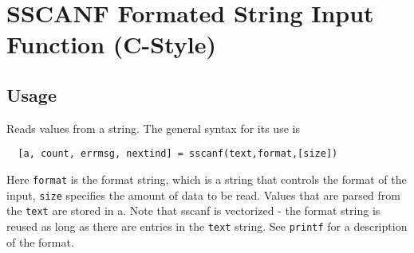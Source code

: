 \section{SSCANF Formated String Input Function (C-Style)}

\subsection{Usage}

Reads values from a string.  The general syntax for its use is
\begin{verbatim}
  [a, count, errmsg, nextind] = sscanf(text,format,[size])
\end{verbatim}
Here \verb|format| is the format string, which is a string that
controls the format of the input, \verb|size| specifies the amount of data to be read. Values that are parsed
from the \verb|text| are stored in a. Note that sscanf is vectorized - the format string is reused as long as
there are entries in the \verb|text| string. See \verb|printf|
for a description of the format.
